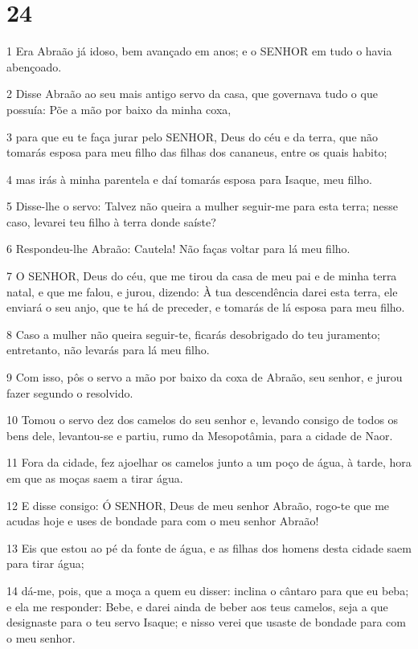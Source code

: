 \chapter{24}

\par 1 Era Abraão já idoso, bem avançado em anos; e o SENHOR em tudo o havia abençoado.
\par 2 Disse Abraão ao seu mais antigo servo da casa, que governava tudo o que possuía: Põe a mão por baixo da minha coxa,
\par 3 para que eu te faça jurar pelo SENHOR, Deus do céu e da terra, que não tomarás esposa para meu filho das filhas dos cananeus, entre os quais habito;
\par 4 mas irás à minha parentela e daí tomarás esposa para Isaque, meu filho.
\par 5 Disse-lhe o servo: Talvez não queira a mulher seguir-me para esta terra; nesse caso, levarei teu filho à terra donde saíste?
\par 6 Respondeu-lhe Abraão: Cautela! Não faças voltar para lá meu filho.
\par 7 O SENHOR, Deus do céu, que me tirou da casa de meu pai e de minha terra natal, e que me falou, e jurou, dizendo: À tua descendência darei esta terra, ele enviará o seu anjo, que te há de preceder, e tomarás de lá esposa para meu filho.
\par 8 Caso a mulher não queira seguir-te, ficarás desobrigado do teu juramento; entretanto, não levarás para lá meu filho.
\par 9 Com isso, pôs o servo a mão por baixo da coxa de Abraão, seu senhor, e jurou fazer segundo o resolvido.
\par 10 Tomou o servo dez dos camelos do seu senhor e, levando consigo de todos os bens dele, levantou-se e partiu, rumo da Mesopotâmia, para a cidade de Naor.
\par 11 Fora da cidade, fez ajoelhar os camelos junto a um poço de água, à tarde, hora em que as moças saem a tirar água.
\par 12 E disse consigo: Ó SENHOR, Deus de meu senhor Abraão, rogo-te que me acudas hoje e uses de bondade para com o meu senhor Abraão!
\par 13 Eis que estou ao pé da fonte de água, e as filhas dos homens desta cidade saem para tirar água;
\par 14 dá-me, pois, que a moça a quem eu disser: inclina o cântaro para que eu beba; e ela me responder: Bebe, e darei ainda de beber aos teus camelos, seja a que designaste para o teu servo Isaque; e nisso verei que usaste de bondade para com o meu senhor.
